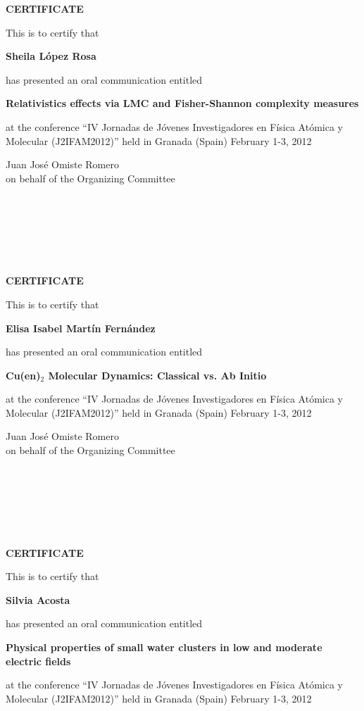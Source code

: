 \documentclass [13pt,a4paper] {letter}
\begin{document}
\pagestyle{empty}
\begin{center}
{\bf {\Huge CERTIFICATE}}

\vspace {1.5cm}
This is to certify that
\vspace {1cm}

{\bf \Large  Sheila    López Rosa  }
\vspace {1cm}

has presented an oral communication entitled
\vspace {1cm}

{\bf \large  Relativistics effects via LMC and Fisher-Shannon complexity measures }
\vspace {1cm}

at the conference { \textquotedblleft IV Jornadas de Jóvenes Investigadores en Física Atómica y Molecular (J2IFAM2012)\textquotedblright} 
held in Granada (Spain) February 1-3, 2012
\end{center}
\vspace {3cm}
\begin{raggedleft}
Juan José Omiste Romero\\
on behalf of the Organizing Committee
\newpage
\end{raggedleft}
\begin{verbatim}






\end{verbatim}
\pagestyle{empty}
\begin{center}
{\bf {\Huge CERTIFICATE}}

\vspace {1.5cm}
This is to certify that
\vspace {1cm}

{\bf \Large  Elisa  Isabel  Martín Fernández }
\vspace {1cm}

has presented an oral communication entitled
\vspace {1cm}

{\bf \large  Cu(en)$_2$ Molecular Dynamics: Classical vs. Ab Initio }
\vspace {1cm}

at the conference { \textquotedblleft IV Jornadas de Jóvenes Investigadores en Física Atómica y Molecular (J2IFAM2012)\textquotedblright} 
held in Granada (Spain) February 1-3, 2012
\end{center}
\vspace {3cm}
\begin{raggedleft}
Juan José Omiste Romero\\
on behalf of the Organizing Committee
\newpage
\end{raggedleft}
\begin{verbatim}






\end{verbatim}
\pagestyle{empty}
\begin{center}
{\bf {\Huge CERTIFICATE}}

\vspace {1.5cm}
This is to certify that
\vspace {1cm}

{\bf \Large  Silvia    Acosta }
\vspace {1cm}

has presented an oral communication entitled
\vspace {1cm}

{\bf \large  Physical properties of small water clusters in low and moderate electric fields }
\vspace {1cm}

at the conference { \textquotedblleft IV Jornadas de Jóvenes Investigadores en Física Atómica y Molecular (J2IFAM2012)\textquotedblright} 
held in Granada (Spain) February 1-3, 2012
\end{center}
\end{document}
